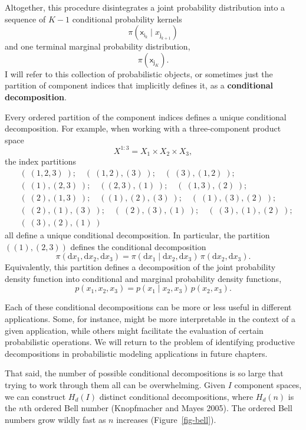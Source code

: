 \documentclass[
  letterpaper,
  DIV=11,
  numbers=noendperiod]{scrartcl}
\begin{document}
Altogether, this procedure disintegrates a joint probability
distribution into a sequence of \(K - 1\) conditional probability
kernels \[
\pi( \mathsf{x}_{ \mathsf{i}_{k} } \mid x_{\mathsf{j}_{k + 1}} )
\] and one terminal marginal probability distribution, \[
\pi( \mathsf{x}_{ \mathsf{j}_{K} } ).
\] I will refer to this collection of probabilistic objects, or
sometimes just the partition of component indices that implicitly
defines it, as a \textbf{conditional decomposition}.

Every ordered partition of the component indices defines a unique
conditional decomposition. For example, when working with a
three-component product space \[
X^{1:3} = X_{1} \times X_{2} \times X_{3},
\] the index partitions \begin{align*}
& ( \; ( 1, 2, 3 ) \; ); \quad ( \; ( 1, 2 ), ( 3 ) \; ); \quad
  ( \; ( 3 ), ( 1, 2 ) \; );
\\
& ( \; ( 1 ), ( 2, 3 ) \; ); \quad ( ( 2, 3 ), ( 1 ) \; ); \quad
  ( \; ( 1, 3 ), ( 2 ) \; );
\\
& ( \; ( 2 ), ( 1, 3 ) \; ); \quad
  ( ( 1 ), ( 2 ), ( 3 ) \; ); \quad
  ( \; ( 1 ), ( 3 ), ( 2 ) \; );
\\
& ( \; ( 2 ), ( 1 ), ( 3 ) \; ); \quad
  ( \; ( 2 ), ( 3 ), ( 1 ) \; ); \quad
  ( \; ( 3 ), ( 1 ), ( 2 ) \; );
\\
& ( \; ( 3 ), ( 2 ), ( 1 ) \; )
\end{align*} all define a unique conditional decomposition. In
particular, the partition \(( ( 1 ), ( 2, 3 ) )\) defines the
conditional decomposition \[
\pi( \mathrm{d} x_{1}, \mathrm{d} x_{2}, \mathrm{d} x_{3} )
=
\pi( \mathrm{d} x_{1} \mid \mathrm{d} x_{2}, \mathrm{d} x_{3} ) \,
\pi( \mathrm{d} x_{2}, \mathrm{d} x_{3} ).
\] Equivalently, this partition defines a decomposition of the joint
probability density function into conditional and marginal probability
density functions, \[
p( x_{1}, x_{2}, x_{3} )
=
p( x_{1} \mid x_{2}, x_{3} ) \,
p( x_{2}, x_{3} ).
\]

Each of these conditional decompositions can be more or less useful in
different applications. Some, for instance, might be more interpretable
in the context of a given application, while others might facilitate the
evaluation of certain probabilistic operations. We will return to the
problem of identifying productive decompositions in probabilistic
modeling applications in future chapters.

That said, the number of possible conditional decompositions is so large
that trying to work through them all can be overwhelming. Given \(I\)
component spaces, we can construct \(H_{d}(I)\) distinct conditional
decompositions, where \(H_{d}(n)\) is the \(n\)th ordered Bell number
(Knopfmacher and Mayes 2005). The ordered Bell numbers grow wildly fast
as \(n\) increases (Figure~\ref{fig-bell}).
\end{document}
